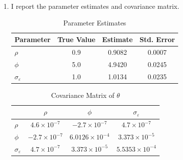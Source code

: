 \documentclass[12pt]{article}
\begin{document}
\begin{enumerate}[label=\arabic*.]
The simulated data are generated by the code. We simulated 2000 times and burnt the first 1000. We start the initial state with $s_0 = [0 \; 0]'$, that is, the steady state. Simulated data are saved in the file \texttt{hw9\_partb\_simulated\_data.txt}. Here we report the $H$ matrix and the $B$ matrix.

\begin{align*}
    H = \begin{bmatrix}
        0.4738 & 0.5911\\
	    -0.4139 & 3.1746\\
	    0.2631 & 1.2044\\
    	-0.1054 & 0.3067
    \end{bmatrix}, \qquad
    B = \begin{bmatrix}
        0.9647 & 0.0794\\
        0 & 0.9
    \end{bmatrix}.
\end{align*}

\newpage
\item I report the parameter estimates and covariance matrix.

\begin{table}[!htbp]
    \centering
    \begin{tabular}{lccc}
    \hline
    Parameter & True Value & Estimate & Std. Error \\
    \hline
    $\rho$        & 0.9 & 0.9082 & 0.0007 \\
    $\phi$        & 5.0 & 4.9420 & 0.0245 \\
    $\sigma_{\varepsilon}$ & 1.0 & 1.0134 & 0.0235 \\
    \hline
    \end{tabular}
    \caption{Parameter Estimates}
\end{table}

\begin{table}[!htbp]
    \centering
    \begin{tabular}{lccc}
    \hline
     & $\rho$ & $\phi$ & $\sigma_{\varepsilon}$ \\
    \hline
    $\rho$        & $4.6\times 10^{-7}$ & $-2.7\times 10^{-7}$ & $4.7\times 10^{-7}$ \\
    $\phi$        & $-2.7\times 10^{-7}$ & $6.0126\times 10^{-4}$ & $3.373\times 10^{-5}$ \\
    $\sigma_{\varepsilon}$ & $4.7\times 10^{-7}$ & $3.373\times 10^{-5}$ & $5.5353\times 10^{-4}$ \\
    \hline
    \end{tabular}
    \caption{Covariance Matrix of $\theta$}
\end{table}


\end{enumerate}
\end{document}
